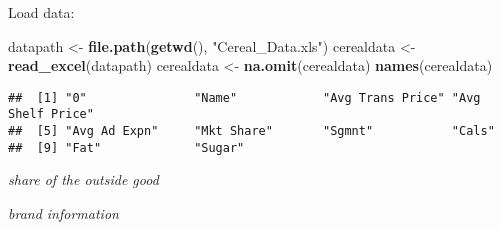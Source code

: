 \documentclass[
]{article}
\newenvironment{Shaded}{\begin{snugshade}}{\end{snugshade}}
\newcommand{\AttributeTok}[1]{\textcolor[rgb]{0.13,0.29,0.53}{#1}}
\newcommand{\DecValTok}[1]{\textcolor[rgb]{0.00,0.00,0.81}{#1}}
\newcommand{\FunctionTok}[1]{\textcolor[rgb]{0.13,0.29,0.53}{\textbf{#1}}}
\newcommand{\NormalTok}[1]{#1}
\newcommand{\OtherTok}[1]{\textcolor[rgb]{0.56,0.35,0.01}{#1}}
\newcommand{\SpecialCharTok}[1]{\textcolor[rgb]{0.81,0.36,0.00}{\textbf{#1}}}
\newcommand{\StringTok}[1]{\textcolor[rgb]{0.31,0.60,0.02}{#1}}
\begin{document}
Load data:

\begin{Shaded}
\begin{Highlighting}[]
\NormalTok{datapath }\OtherTok{\textless{}{-}} \FunctionTok{file.path}\NormalTok{(}\FunctionTok{getwd}\NormalTok{(), }\StringTok{"Cereal\_Data.xls"}\NormalTok{) }
\NormalTok{cerealdata }\OtherTok{\textless{}{-}} \FunctionTok{read\_excel}\NormalTok{(datapath)}
\NormalTok{cerealdata }\OtherTok{\textless{}{-}} \FunctionTok{na.omit}\NormalTok{(cerealdata)}
\FunctionTok{names}\NormalTok{(cerealdata)}
\end{Highlighting}
\end{Shaded}

\begin{verbatim}
##  [1] "0"               "Name"            "Avg Trans Price" "Avg Shelf Price"
##  [5] "Avg Ad Expn"     "Mkt Share"       "Sgmnt"           "Cals"           
##  [9] "Fat"             "Sugar"
\end{verbatim}

\emph{share of the outside good}

\begin{Shaded}
\end{Shaded}

\emph{brand information}

\begin{Shaded}
\end{Shaded}
\end{document}
